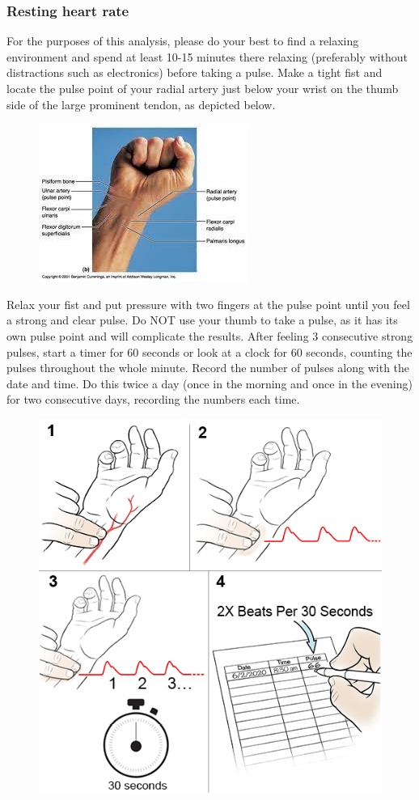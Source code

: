 \documentclass{article}
\begin{document}
\subsubsection{Resting heart rate}
For the purposes of this analysis, please do your best to find a relaxing environment and spend at least 10-15 minutes there relaxing (preferably without distractions such as electronics) before taking a pulse. Make a tight fist and locate the pulse point of your radial artery just below your wrist on the thumb side of the large prominent tendon, as depicted below.

\begin{figure}[h!]
\centering
\includegraphics{pics/pulse.jpeg}
\end{figure}

Relax your fist and put pressure with two fingers at the pulse point until you feel a strong and clear pulse. Do NOT use your thumb to take a pulse, as it has its own pulse point and will complicate the results. After feeling 3 consecutive strong pulses, start a timer for 60 seconds or look at a clock for 60 seconds, counting the pulses throughout the whole minute. Record the number of pulses along with the date and time. Do this twice a day (once in the morning and once in the evening) for two consecutive days, recording the numbers each time. 

\begin{figure}[h!]
\centering
\includegraphics[width=0.6\linewidth]{pics/pulse2.jpeg}
\end{figure}
\end{document}

